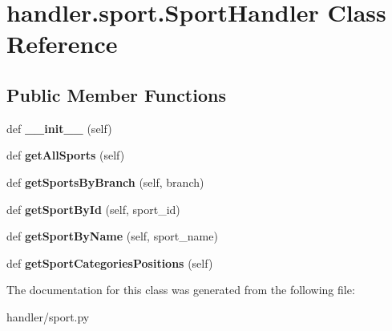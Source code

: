 \hypertarget{classhandler_1_1sport_1_1_sport_handler}{}\section{handler.\+sport.\+Sport\+Handler Class Reference}
\label{classhandler_1_1sport_1_1_sport_handler}
\subsection*{Public Member Functions}
\begin{DoxyCompactItemize}
\item 
\mbox{\label{classhandler_1_1sport_1_1_sport_handler_a72e5a6d4eb4f625284bd3fc8a19e54f9}} 
def {\bfseries \+\_\+\+\_\+init\+\_\+\+\_\+} (self)
\item 
\mbox{\label{classhandler_1_1sport_1_1_sport_handler_a8bdc68a2a00be3fc4c66b75aea4abbc3}} 
def {\bfseries get\+All\+Sports} (self)
\item 
\mbox{\label{classhandler_1_1sport_1_1_sport_handler_a5cd67d66c4b722c46da490fe63beff74}} 
def {\bfseries get\+Sports\+By\+Branch} (self, branch)
\item 
\mbox{\label{classhandler_1_1sport_1_1_sport_handler_a18849851d8f9daf78e2e879ac9806a20}} 
def {\bfseries get\+Sport\+By\+Id} (self, sport\+\_\+id)
\item 
\mbox{\label{classhandler_1_1sport_1_1_sport_handler_ad7fbc2c9ab7563cc23ca0b5a3d4820ab}} 
def {\bfseries get\+Sport\+By\+Name} (self, sport\+\_\+name)
\item 
\mbox{\label{classhandler_1_1sport_1_1_sport_handler_ad83c6e5db6358cf97f46b04135100c53}} 
def {\bfseries get\+Sport\+Categories\+Positions} (self)
\end{DoxyCompactItemize}


The documentation for this class was generated from the following file\+:\begin{DoxyCompactItemize}
\item 
handler/sport.\+py\end{DoxyCompactItemize}
